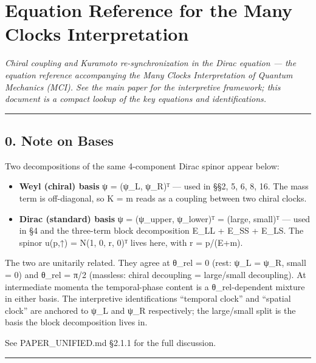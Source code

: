 \documentclass[
]{article}
\author{}
\date{}
\providecommand{\tightlist}{%
  \setlength{\itemsep}{0pt}\setlength{\parskip}{0pt}}
\begin{document}
{
\setcounter{tocdepth}{2}
\tableofcontents
}
\section{Equation Reference for the Many Clocks
Interpretation}\label{equation-reference-for-the-many-clocks-interpretation}

\emph{Chiral coupling and Kuramoto re-synchronization in the Dirac
equation --- the equation reference accompanying the Many Clocks
Interpretation of Quantum Mechanics (MCI). See the main paper for the
interpretive framework; this document is a compact lookup of the key
equations and identifications.}

\begin{center}\rule{0.5\linewidth}{0.5pt}\end{center}

\subsection{0. Note on Bases}\label{note-on-bases}

Two decompositions of the same 4-component Dirac spinor appear below:

\begin{itemize}
\tightlist
\item
  \textbf{Weyl (chiral) basis} ψ = (ψ\_L, ψ\_R)ᵀ --- used in §§2, 5, 6,
  8, 16. The mass term is off-diagonal, so K = m reads as a coupling
  between two chiral clocks.
\item
  \textbf{Dirac (standard) basis} ψ = (ψ\_upper, ψ\_lower)ᵀ = (large,
  small)ᵀ --- used in §4 and the three-term block decomposition E\_LL +
  E\_SS + E\_LS. The spinor u(p,↑) = N(1, 0, r, 0)ᵀ lives here, with r =
  p/(E+m).
\end{itemize}

The two are unitarily related. They agree at θ\_rel = 0 (rest: ψ\_L =
ψ\_R, small = 0) and θ\_rel = π/2 (massless: chiral decoupling =
large/small decoupling). At intermediate momenta the temporal-phase
content is a θ\_rel-dependent mixture in either basis. The interpretive
identifications ``temporal clock'' and ``spatial clock'' are anchored to
ψ\_L and ψ\_R respectively; the large/small split is the basis the block
decomposition lives in.

See PAPER\_UNIFIED.md §2.1.1 for the full discussion.

\begin{center}\rule{0.5\linewidth}{0.5pt}\end{center}
\end{document}
